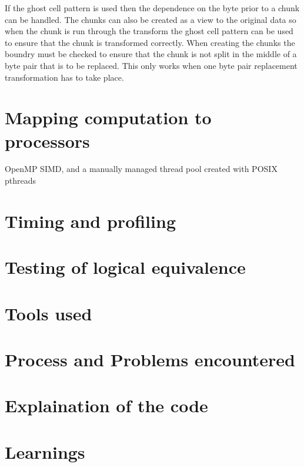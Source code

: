 \documentclass{article}
\begin{document}
If the ghost cell pattern is used then the dependence on the byte prior to a chunk can be handled. The chunks can
also be created as a view to the original data so when the chunk is run through the transform the ghost cell 
pattern can be used to ensure that the chunk is transformed correctly. When creating the chunks the boundry must 
be checked to ensure that the chunk is not split in the middle of a byte pair that is to be replaced. 
This only works when one byte pair replacement transformation has to take place.





\section{Mapping computation to processors}
OpenMP SIMD, and a manually managed thread pool created with POSIX pthreads

\section{Timing and profiling}

\section{Testing of logical equivalence}

\section{Tools used}

\section{Process and Problems encountered}

\section{Explaination of the code}

\section{Learnings}
\end{document}

